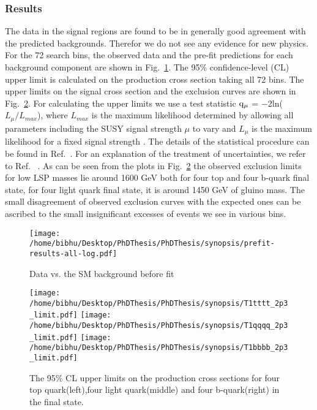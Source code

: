 

\subsubsection{Results}
The data in the signal regions are found to be in 
generally good agreement with the predicted backgrounds. Therefor we do not see any evidence for new physics. For the 72
search bins, the observed data and the pre-fit predictions for each background component are shown in Fig.~\ref{fig:Datavsbkg}. The 95\% confidence-level   (CL) upper limit is calculated on the production cross section taking all 72 bins. The upper limits on the signal cross section and the exclusion curves are shown in Fig.~\ref{fig:Limit2015Synop}. For calculating the upper limits we use  a test  statistic  $\rm q_{\mu}$ = $-$2ln($L_{\mu}/L_{max}$), where $L_{max}$ is the maximum likelihood determined by allowing all parameters including the SUSY signal strength $\mu$ to vary and $L_{\mu}$ is the maximum likelihood for a fixed signal strength . The details of the statistical procedure can be found in Ref.~\cite{CMS-NOTE-2011-005}.  For an explanation of the treatment of uncertainties, we refer to Ref. ~\cite{CMS-PAS-SUS-15-002}. As can be seen from the plots in Fig.~\ref{fig:Limit2015Synop} the observed exclusion limits for low LSP masses lie around 1600 GeV both for four top and four b-quark final state, for four light quark final state, it is around 1450 GeV of gluino mass. The small disagreement of observed exclusion curves with the expected ones can be ascribed to the small insignificant excesses of events we see in various bins.  
\begin{figure}[h]
\begin{center}
\texttt{[image: /home/bibhu/Desktop/PhDThesis/PhDThesis/synopsis/prefit-results-all-log.pdf]}
\caption{\label{fig:Datavsbkg} Data vs. the SM background before fit}
\end{center}
\end{figure}
\begin{figure}[h]
\centering
\texttt{[image: /home/bibhu/Desktop/PhDThesis/PhDThesis/synopsis/T1tttt\_2p3\_limit.pdf]}
\texttt{[image: /home/bibhu/Desktop/PhDThesis/PhDThesis/synopsis/T1qqqq\_2p3\_limit.pdf]}
\texttt{[image: /home/bibhu/Desktop/PhDThesis/PhDThesis/synopsis/T1bbbb\_2p3\_limit.pdf]}
\caption{\label{fig:Limit2015Synop}The 95\% CL upper limits on the production cross sections for four top quark(left),four light quark(middle) and four b-quark(right) in the final state. }
\end{figure}

